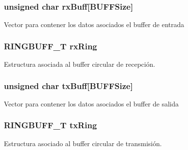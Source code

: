 \subsubsection[{\texorpdfstring{rx\+Buff}{rxBuff}}]{\setlength{\rightskip}{0pt plus 5cm}unsigned char rx\+Buff\mbox{[}{\bf B\+U\+F\+F\+Size}\mbox{]}}\hypertarget{group__operaciones_ga62ff739e128714bd8668fc1881669090}{}\label{group__operaciones_ga62ff739e128714bd8668fc1881669090}
Vector para contener los datos asociados el buffer de entrada 
\subsubsection[{\texorpdfstring{rx\+Ring}{rxRing}}]{\setlength{\rightskip}{0pt plus 5cm}R\+I\+N\+G\+B\+U\+F\+F\+\_\+T rx\+Ring}\hypertarget{group__operaciones_gab9788d6aaf5b45a37bf7384056801886}{}\label{group__operaciones_gab9788d6aaf5b45a37bf7384056801886}
Estructura asociada al buffer circular de recepción. 
\subsubsection[{\texorpdfstring{tx\+Buff}{txBuff}}]{\setlength{\rightskip}{0pt plus 5cm}unsigned char tx\+Buff\mbox{[}{\bf B\+U\+F\+F\+Size}\mbox{]}}\hypertarget{group__operaciones_gaecd7d757d466624f64f960512f1e46e7}{}\label{group__operaciones_gaecd7d757d466624f64f960512f1e46e7}
Vector para contener los datos asociados el buffer de salida 
\subsubsection[{\texorpdfstring{tx\+Ring}{txRing}}]{\setlength{\rightskip}{0pt plus 5cm}R\+I\+N\+G\+B\+U\+F\+F\+\_\+T tx\+Ring}\hypertarget{group__operaciones_ga053907efdc46df32728b7a467638a604}{}\label{group__operaciones_ga053907efdc46df32728b7a467638a604}
Estructura asociado al buffer circular de transmisión. 